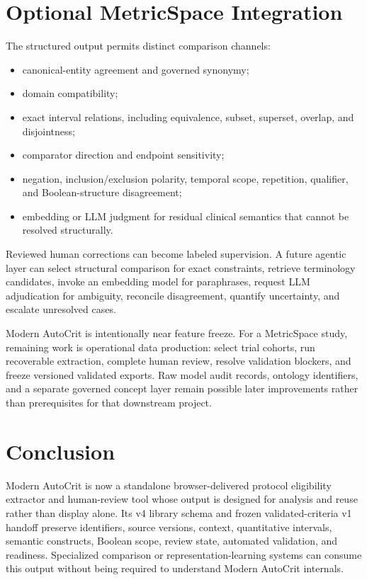 \documentclass[11pt]{article}
\begin{document}
\section{Optional MetricSpace Integration}

The structured output permits distinct comparison channels:

\begin{itemize}
  \item canonical-entity agreement and governed synonymy;
  \item domain compatibility;
  \item exact interval relations, including equivalence, subset, superset, overlap, and disjointness;
  \item comparator direction and endpoint sensitivity;
  \item negation, inclusion/exclusion polarity, temporal scope, repetition, qualifier, and Boolean-structure disagreement;
  \item embedding or LLM judgment for residual clinical semantics that cannot be resolved structurally.
\end{itemize}

Reviewed human corrections can become labeled supervision. A future agentic layer can select structural comparison for exact constraints, retrieve terminology candidates, invoke an embedding model for paraphrases, request LLM adjudication for ambiguity, reconcile disagreement, quantify uncertainty, and escalate unresolved cases.

Modern AutoCrit is intentionally near feature freeze. For a MetricSpace study, remaining work is operational data production: select trial cohorts, run recoverable extraction, complete human review, resolve validation blockers, and freeze versioned validated exports. Raw model audit records, ontology identifiers, and a separate governed concept layer remain possible later improvements rather than prerequisites for that downstream project.

\section{Conclusion}

Modern AutoCrit is now a standalone browser-delivered protocol eligibility extractor and human-review tool whose output is designed for analysis and reuse rather than display alone. Its v4 library schema and frozen validated-criteria v1 handoff preserve identifiers, source versions, context, quantitative intervals, semantic constructs, Boolean scope, review state, automated validation, and readiness. Specialized comparison or representation-learning systems can consume this output without being required to understand Modern AutoCrit internals.
\end{document}

